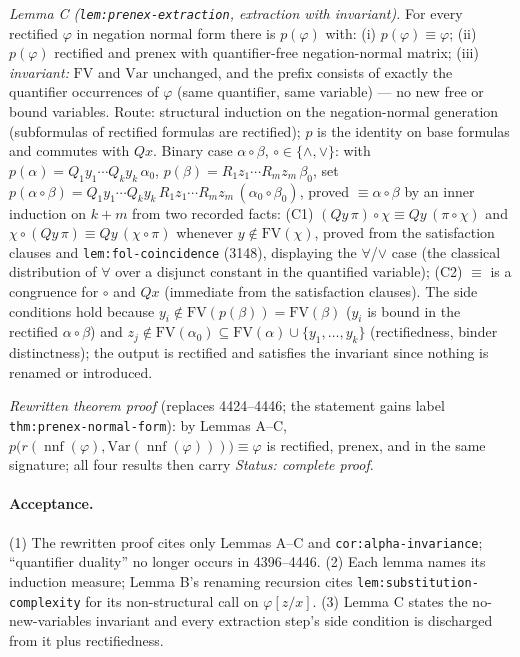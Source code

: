 \emph{Lemma C (\texttt{lem:prenex-extraction}, extraction with invariant).}
For every rectified \(\varphi\) in negation normal form there is
\(p(\varphi)\) with: (i) \(p(\varphi)\equiv\varphi\); (ii) \(p(\varphi)\)
rectified and prenex with quantifier-free negation-normal matrix; (iii)
\emph{invariant:} \(\mathrm{FV}\) and \(\mathrm{Var}\) unchanged, and the
prefix consists of exactly the quantifier occurrences of \(\varphi\) (same
quantifier, same variable) --- no new free or bound variables.  Route:
structural induction on the negation-normal generation (subformulas of
rectified formulas are rectified); \(p\) is the identity on base formulas and
commutes with \(Qx\).  Binary case \(\alpha\circ\beta\),
\(\circ\in\{\wedge,\vee\}\): with
\(p(\alpha)=Q_1y_1\cdots Q_ky_k\,\alpha_0\),
\(p(\beta)=R_1z_1\cdots R_mz_m\,\beta_0\), set
\(p(\alpha\circ\beta)=Q_1y_1\cdots Q_ky_k\,R_1z_1\cdots R_mz_m\,
(\alpha_0\circ\beta_0)\), proved \(\equiv\alpha\circ\beta\) by an inner
induction on \(k+m\) from two recorded facts: (C1)
\((Qy\,\pi)\circ\chi\equiv Qy\,(\pi\circ\chi)\) and
\(\chi\circ(Qy\,\pi)\equiv Qy\,(\chi\circ\pi)\) whenever
\(y\notin\mathrm{FV}(\chi)\), proved from the satisfaction clauses and
\texttt{lem:fol-coincidence} (3148), displaying the \(\forall\)/\(\vee\) case
(the classical distribution of \(\forall\) over a disjunct constant in the
quantified variable); (C2) \(\equiv\) is a congruence for \(\circ\) and
\(Qx\) (immediate from the satisfaction clauses).  The side conditions hold
because \(y_i\notin\mathrm{FV}(p(\beta))=\mathrm{FV}(\beta)\) (\(y_i\) is
bound in the rectified \(\alpha\circ\beta\)) and
\(z_j\notin\mathrm{FV}(\alpha_0)\subseteq
\mathrm{FV}(\alpha)\cup\{y_1,\ldots,y_k\}\) (rectifiedness, binder
distinctness); the output is rectified and satisfies the invariant since
nothing is renamed or introduced.

\emph{Rewritten theorem proof} (replaces 4424--4446; the statement gains label
\texttt{thm:prenex-normal-form}): by Lemmas A--C,
\(p\bigl(r(\operatorname{nnf}(\varphi),\mathrm{Var}(\operatorname{nnf}(\varphi)))\bigr)
\equiv\varphi\) is rectified, prenex, and in the same signature; all four
results then carry \textit{Status: complete proof}.

\paragraph{Acceptance.}
(1) The rewritten proof cites only Lemmas A--C and
\texttt{cor:alpha-invariance}; ``quantifier duality'' no longer occurs in
4396--4446.  (2) Each lemma names its induction measure; Lemma B's renaming
recursion cites \texttt{lem:substitution-complexity} for its non-structural
call on \(\varphi[z/x]\).  (3) Lemma C states the no-new-variables invariant and every extraction
step's side condition is discharged from it plus rectifiedness.

